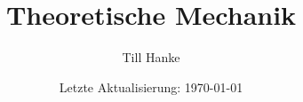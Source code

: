 \documentclass{scrartcl}
\begin{document}
\title{Theoretische Mechanik}
\author{Till Hanke}
\date{Letzte Aktualisierung: \today}

\maketitle
\tableofcontents




\end{document}
